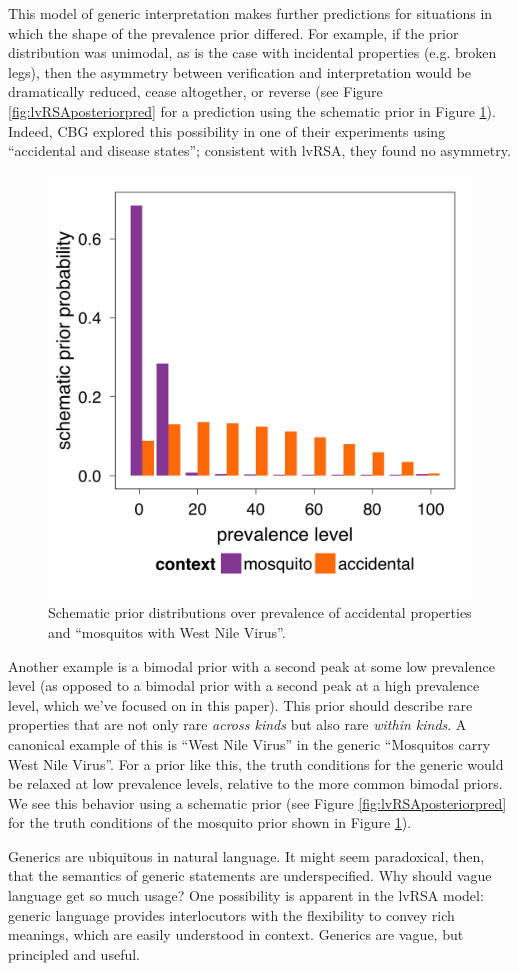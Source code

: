 \documentclass[10pt,letterpaper]{article}
\begin{document}
This model of generic interpretation makes further predictions for situations in which the shape of the prevalence prior differed. For example, if the prior distribution was unimodal, as is the case with incidental properties (e.g. broken legs), then the asymmetry between verification and interpretation would be dramatically reduced, cease altogether, or reverse (see Figure \ref{fig:lvRSAposteriorpred} for a prediction using the schematic prior in Figure \ref{fig:schematic}). Indeed, CBG explored this possibility in one of their experiments using ``accidental and disease states''; consistent with lvRSA, they found no asymmetry. 
\begin{figure}
  \begin{center}
    \includegraphics[width=0.48\columnwidth]{schematic_priors}
  \end{center}
  \caption{Schematic prior distributions over prevalence of accidental properties and ``mosquitos with West Nile Virus''.}
   \label{fig:schematic}
\end{figure}
%
Another example is a bimodal prior with a second peak at some low prevalence level (as opposed to a bimodal prior with a second peak at a high prevalence level, which we've focused on in this paper). This prior should describe rare properties that are not only rare \emph{across kinds} but also rare \emph{within kinds}. A canonical example of this is ``West Nile Virus'' in the generic ``Mosquitos carry West Nile Virus''. For a prior like this, the truth conditions for the generic would be relaxed at low prevalence levels, relative to the more common bimodal priors. We see this behavior using a schematic prior (see Figure \ref{fig:lvRSAposteriorpred} for the truth conditions of the mosquito prior shown in Figure \ref{fig:schematic}). 


Generics are ubiquitous in natural language. It might seem paradoxical, then, that the semantics of generic statements are underspecified. Why should vague language get so much usage? One possibility is apparent in the lvRSA model: generic language provides interlocutors with the flexibility to convey rich meanings, which are easily understood in context. 
Generics are vague, but principled and useful.
\end{document}
